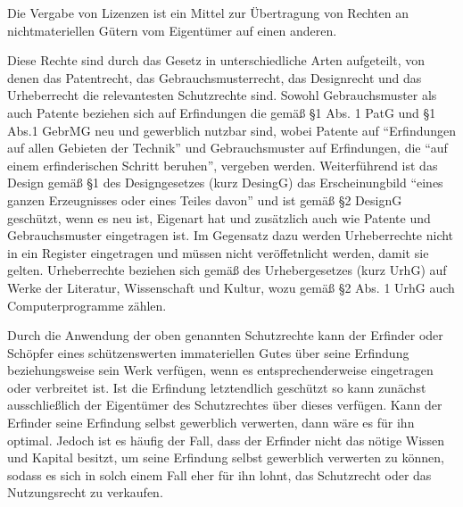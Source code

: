 Die Vergabe von Lizenzen ist ein Mittel zur Übertragung von Rechten an nichtmateriellen Gütern vom Eigentümer auf einen anderen. 

Diese Rechte sind durch das Gesetz in unterschiedliche Arten aufgeteilt, von denen das Patentrecht, das Gebrauchsmusterrecht, das Designrecht und das Urheberrecht die relevantesten Schutzrechte sind.
Sowohl Gebrauchsmuster als auch Patente beziehen sich auf Erfindungen die gemäß §1 Abs. 1 PatG und §1 Abs.1 GebrMG neu und gewerblich nutzbar sind,
wobei Patente auf “Erfindungen auf allen Gebieten der Technik” und Gebrauchsmuster auf Erfindungen, die “auf einem erfinderischen Schritt beruhen”, vergeben werden.
Weiterführend ist das Design gemäß §1 des Designgesetzes (kurz DesingG) das Erscheinungbild “eines ganzen Erzeugnisses oder eines Teiles davon” und ist gemäß §2 DesignG geschützt,
wenn es neu ist, Eigenart hat und zusätzlich auch wie Patente und Gebrauchsmuster eingetragen ist. Im Gegensatz dazu werden Urheberrechte nicht in ein Register eingetragen und müssen nicht
veröffetnlicht werden, damit sie gelten. Urheberrechte beziehen sich gemäß des Urhebergesetzes (kurz UrhG) auf Werke der Literatur, Wissenschaft und Kultur,
wozu gemäß §2 Abs. 1 UrhG auch Computerprogramme zählen. 

Durch die Anwendung der oben genannten Schutzrechte kann der Erfinder oder Schöpfer eines schützenswerten immateriellen Gutes über seine Erfindung beziehungsweise sein Werk verfügen,
wenn es entsprechenderweise eingetragen oder verbreitet ist. Ist die Erfindung letztendlich geschützt so kann zunächst ausschließlich der Eigentümer des Schutzrechtes über dieses verfügen.
Kann der Erfinder seine Erfindung selbst gewerblich verwerten, dann wäre es für ihn optimal. Jedoch ist es häufig der Fall, dass der Erfinder nicht das nötige Wissen und Kapital besitzt,
um seine Erfindung selbst gewerblich verwerten zu können, sodass es sich in solch einem Fall eher für ihn lohnt, das Schutzrecht oder das Nutzungsrecht zu verkaufen. 


